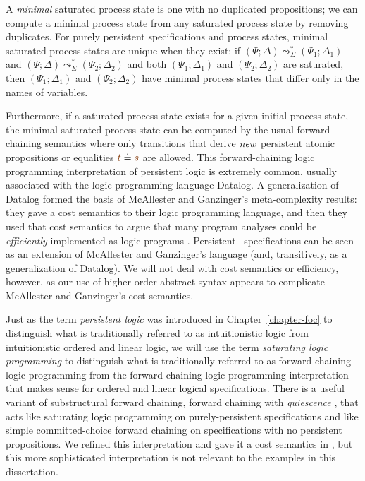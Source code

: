 A {\it minimal} saturated process state is one with no duplicated
propositions; we can compute a minimal process state from any
saturated process state by removing duplicates. For purely persistent
specifications and process states, minimal saturated process states
are unique when they exist: if $(\Psi; \Delta) \leadsto^*_\Sigma
(\Psi_1; \Delta_1)$ and $(\Psi; \Delta) \leadsto^*_\Sigma (\Psi_2;
\Delta_2)$ and both $(\Psi_1; \Delta_1)$ and $(\Psi_2; \Delta_2)$ are
saturated, then $(\Psi_1; \Delta_1)$ and $(\Psi_2; \Delta_2)$ have
minimal process states that differ only in the names of variables.

Furthermore, if a saturated process state exists for a given initial
process state, the minimal saturated process state can be computed by
the usual forward-chaining semantics where only transitions that
derive ${\it new}$ persistent atomic propositions or equalities
$\lf{t} \doteq \lf{s}$ are allowed. This forward-chaining logic
programming interpretation of persistent logic is extremely common,
usually associated with the logic programming language
Datalog.  A generalization of Datalog formed the basis of McAllester
and Ganzinger's meta-complexity results: they gave a cost semantics to
their logic programming language, and then they used that cost
semantics to argue that many program analyses could be {\it
  efficiently} implemented as logic programs
\cite{mcallester02complexity,ganzinger02logical}. Persistent
\sls~specifications can be seen as an extension of McAllester and
Ganzinger's language (and, transitively, as a generalization of
Datalog). We will not deal with cost semantics or efficiency, however,
as our use of higher-order abstract syntax appears to complicate 
McAllester and
Ganzinger's cost semantics.

Just as the term {\it persistent logic} was introduced in 
Chapter~\ref{chapter-foc} to
distinguish what is traditionally referred to as intuitionistic logic
from intuitionistic ordered and linear logic, we will use the term
{\it saturating logic programming} to distinguish what is
traditionally referred to as forward-chaining logic programming from
the forward-chaining logic programming interpretation that makes sense
for ordered and linear logical specifications. There is a useful
variant of substructural forward chaining, forward chaining with {\it
  quiescence} \cite{lopez05monadic}, that acts like saturating logic
programming on purely-persistent specifications and like simple
committed-choice forward chaining on specifications with no persistent
propositions. We refined this interpretation and gave it a cost
semantics in \cite{simmons08linear}, but this more sophisticated
interpretation is not relevant to the examples in this dissertation.

